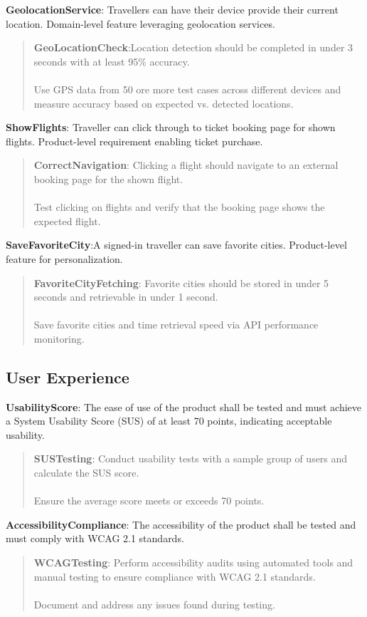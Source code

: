 \textbf{GeolocationService}: Travellers can have their device provide their current location. Domain-level feature leveraging geolocation services.
\begin{quote}
    \textbf{GeoLocationCheck}:Location detection should be completed in under 3 seconds with at least 95\% accuracy.\\ \\
    Use GPS data from 50 ore more test cases across different devices and measure accuracy based on expected vs. detected locations.
\end{quote}
\textbf{ShowFlights}: Traveller can click through to ticket booking page for shown flights. Product-level requirement enabling ticket purchase.
    \begin{quote}
        \textbf{CorrectNavigation}: Clicking a flight should navigate to
        an external booking page for the shown flight.\\\\
        Test clicking on flights and verify that the booking page shows the expected flight.
    \end{quote}
\textbf{SaveFavoriteCity}:A signed-in traveller can save favorite cities. Product-level feature for personalization.
\begin{quote}
    \textbf{FavoriteCityFetching}: Favorite cities should be stored in under 5 seconds and retrievable in under 1 second. \\ \\
    Save favorite cities and time retrieval speed via API performance monitoring.
\end{quote}

\subsection{User Experience}
\textbf{UsabilityScore}: The ease of use of the product shall be tested and must achieve a System Usability Score (SUS) of at least 70 points, indicating acceptable usability.
\begin{quote}
    \textbf{SUSTesting}: Conduct usability tests with a sample group of users and calculate the SUS score. \\ \\
    Ensure the average score meets or exceeds 70 points.
\end{quote}

\textbf{AccessibilityCompliance}: The accessibility of the product shall be tested and must comply with WCAG 2.1 standards.
\begin{quote}
    \textbf{WCAGTesting}: Perform accessibility audits using automated tools and manual testing to ensure compliance with WCAG 2.1 standards. \\ \\
    Document and address any issues found during testing.
\end{quote}

